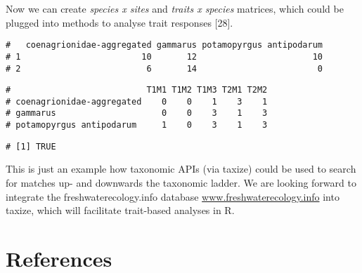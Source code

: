 Now we can create \emph{species x sites} and \emph{traits x species} matrices, which could be plugged into methods to analyse trait responses [28].


\begin{knitrout}
\color{fgcolor}\begin{kframe}
\begin{alltt}
\hlopt{$} \hlkwb{<-} \hlopt{$}\hlstd{traits[}\hlstd{(}\hlopt{$}\hlopt{$}\hlstd{taxon)]}
 \hlkwb{<-}  \hlopt{~}     \hlstd{=} \hlstd{)}
 \hlkwb{<-} \hlopt{$}
\hlopt{$} \hlkwb{<-} 
\end{alltt}
\begin{verbatim}
#   coenagrionidae-aggregated gammarus potamopyrgus antipodarum
# 1                        10       12                       10
# 2                         6       14                        0
\end{verbatim}
\begin{alltt}
 \hlkwb{<-} \hlstd{traits[,} \hlopt{:}\hlstd{][}\hlstd{(}\hlopt{$}\hlstd{taxon_cleaned), ]}
 \hlkwb{<-} \hlopt{$}
\hlopt{$} \hlkwb{<-} 
\end{alltt}
\begin{verbatim}
#                           T1M1 T1M2 T1M3 T2M1 T2M2
# coenagrionidae-aggregated    0    0    1    3    1
# gammarus                     0    0    3    1    3
# potamopyrgus antipodarum     1    0    3    1    3
\end{verbatim}
\begin{alltt}
\hlstd{(} \hlopt{==} 
\end{alltt}
\begin{verbatim}
# [1] TRUE
\end{verbatim}
\end{kframe}
\end{knitrout}


This is just an example how taxonomic APIs (via taxize) could be used to search for matches up- and downwards the taxonomic ladder. We are looking forward to integrate the freshwaterecology.info database \url{www.freshwaterecology.info} into taxize, which will facilitate trait-based analyses in R.


\section*{References}
\printbibliography[heading=none]
